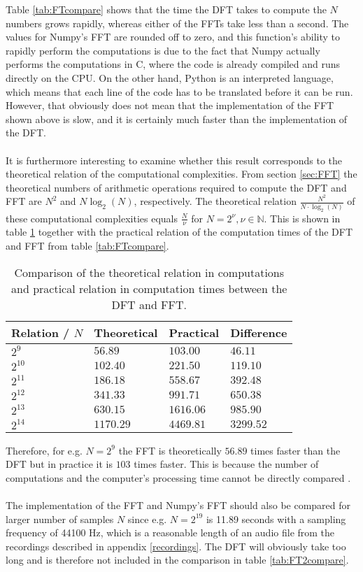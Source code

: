 Table \ref{tab:FTcompare} shows that the time the DFT takes to compute the $N$ numbers grows rapidly, whereas either of the FFTs take less than a second. The values for Numpy's FFT are rounded off to zero, and this function's ability to rapidly perform the computations is due to the fact that Numpy actually performs the computations in C, where the code is already compiled and runs directly on the CPU. On the other hand, Python is an interpreted language, which means that each line of the code has to be translated before it can be run. However, that obviously does not mean that the implementation of the FFT shown above is slow, and it is certainly much faster than the implementation of the DFT.
\\ \\
It is furthermore interesting to examine whether this result corresponds to the theoretical relation of the computational complexities. From section \ref{sec:FFT} the theoretical numbers of arithmetic operations required to compute the DFT and FFT are $N^2$ and $N\log_2(N)$, respectively. The theoretical relation $\frac{N^2}{N \cdot \log_2(N)}$ of these computational complexities equals $\frac{N}{\nu}$ for $N = 2^\nu, \nu \in \mathbb{N}$. This is shown in table \ref{tab:com_compare} together with the practical relation of the computation times of the DFT and FFT from table \ref{tab:FTcompare}.

\begin{table}[H]
\centering
\begin{tabular}{|l|l|l|l|}
\hline
Relation / $N$	& Theoretical 	& Practical	& Difference		\\ \hline
$2^9$  	   		& $56.89$    	& $103.00$	& $46.11$	\\ \hline
$2^{10}$   		& $102.40$    	& $221.50$	& $119.10$	\\ \hline
$2^{11}$   		& $186.18$   	& $558.67$	& $392.48$	\\ \hline
$2^{12}$   		& $341.33$   	& $991.71$	& $650.38$	\\ \hline
$2^{13}$   		& $630.15$  	& $1616.06$	& $985.90$	\\ \hline
$2^{14}$   		& $1170.29$ 	& $4469.81$	& $3299.52$	\\ \hline
\end{tabular}
\caption{Comparison of the theoretical relation in computations and practical relation in computation times between the DFT and FFT.}
\label{tab:com_compare}
\end{table}

Therefore, for e.g. $N = 2^9$ the FFT is theoretically $56.89$ times faster than the DFT but in practice it is $103$ times faster. This is because the number of computations and the computer's processing time cannot be directly compared .
\\ \\
The implementation of the FFT and Numpy's FFT should also be compared for larger number of samples $N$ since e.g. $N = 2^{19}$ is 11.89 seconds with a sampling frequency of 44100 Hz, which is a reasonable length of an audio file from the recordings described in appendix \ref{recordings}. The DFT will obviously take too long and is therefore not included in the comparison in table \ref{tab:FT2compare}.

